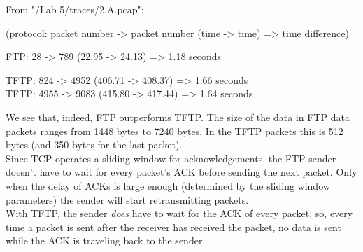 From "/Lab 5/traces/2.A.pcap":

(protocol: packet number -> packet number (time -> time) => time difference)

FTP: 28 -> 789 (22.95 -> 24.13) => 1.18 seconds

TFTP: 824 -> 4952 (406.71 -> 408.37) => 1.66 seconds \\
TFTP: 4955 -> 9083 (415.80 -> 417.44) => 1.64 seconds

We see that, indeed, FTP outperforms TFTP.
The size of the data in FTP data packets ranges from 1448 bytes to 7240 bytes. In the TFTP packets this is 512 bytes (and 350 bytes for the last packet). \\

Since TCP operates a sliding window for acknowledgements, the FTP sender doesn't have to wait for every packet's ACK before sending the next packet. Only when the delay of ACKs is large enough (determined by the sliding window parameters) the sender will start retransmitting packets. \\
With TFTP, the sender \emph{does} have to wait for the ACK of every packet, so, every time a packet is sent after the receiver has received the packet, no data is sent while the ACK is traveling back to the sender.
